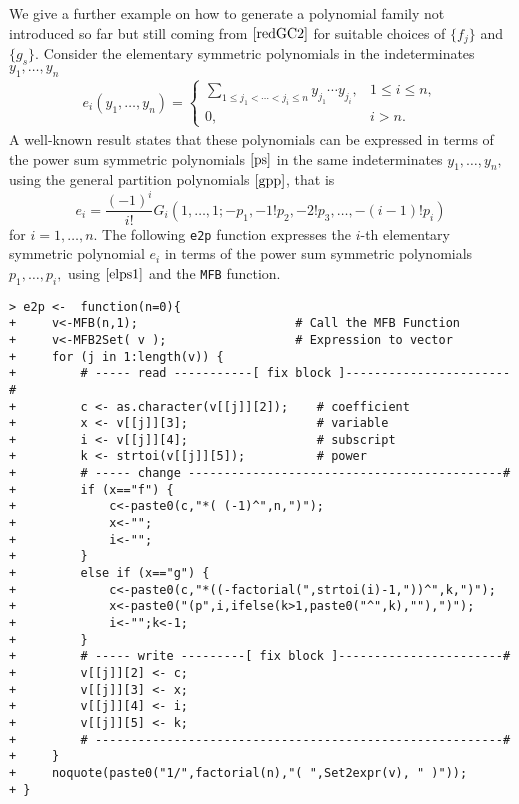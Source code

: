 We give a further example on how to generate a polynomial family not
introduced so far but still coming from \(\eqref{redGC2}\) for suitable
choices of \(\{f_j\}\) and \(\{g_{s}\}.\) Consider the elementary
symmetric polynomials in the indeterminates \(y_1, \ldots, y_n\)
\begin{eqnarray}  
e_i(y_1, \ldots, y_n) = \left\{ \begin{array}{cl} 
\displaystyle{\sum_{1\leq j_1 < \cdots < j_i \leq n}} y_{j_1} \cdots y_{j_i}, & 1 \leq i \leq n, \\
0,      &  i > n.
\end{array}
\right.
\end{eqnarray} A well-known result \citep{MR1937238} states that these
polynomials can be expressed in terms of the power sum symmetric
polynomials \(\eqref{ps}\) in the same indeterminates
\(y_1, \ldots, y_n,\) using the general partition polynomials
\(\eqref{gpp}\), that is \begin{equation}
e_i = \frac{(-1)^i}{i!} G_i (1, \ldots, 1; - p_1, - 1! p_2, - 2! p_3, \ldots, -(i-1)! p_i)
\label{elps1}
\end{equation} for \(i=1, \ldots, n.\) The following \texttt{e2p}
function expresses the \(i\)-th elementary symmetric polynomial \(e_i\)
in terms of the power sum symmetric polynomials \(p_1, \ldots, p_i,\)
using \(\eqref{elps1}\) and the \texttt{MFB} function.

\begin{verbatim}
> e2p <-  function(n=0){
+     v<-MFB(n,1);                      # Call the MFB Function
+     v<-MFB2Set( v );                  # Expression to vector
+     for (j in 1:length(v)) {
+         # ----- read -----------[ fix block ]-----------------------#
+         c <- as.character(v[[j]][2]);    # coefficient
+         x <- v[[j]][3];                  # variable
+         i <- v[[j]][4];                  # subscript
+         k <- strtoi(v[[j]][5]);          # power
+         # ----- change --------------------------------------------#
+         if (x=="f") {
+             c<-paste0(c,"*( (-1)^",n,")");
+             x<-"";
+             i<-"";
+         }
+         else if (x=="g") {
+             c<-paste0(c,"*((-factorial(",strtoi(i)-1,"))^",k,")");
+             x<-paste0("(p",i,ifelse(k>1,paste0("^",k),""),")");
+             i<-"";k<-1;
+         }
+         # ----- write ---------[ fix block ]-----------------------#
+         v[[j]][2] <- c;
+         v[[j]][3] <- x;
+         v[[j]][4] <- i;
+         v[[j]][5] <- k;
+         # ---------------------------------------------------------#
+     }
+     noquote(paste0("1/",factorial(n),"( ",Set2expr(v), " )"));
+ }
\end{verbatim}

